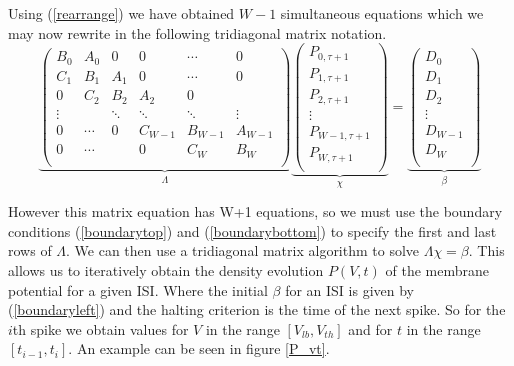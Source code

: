 \documentclass[10pt]{article}
\begin{document}
Using (\ref{rearrange}) we have obtained $W-1$ simultaneous equations which
we may now rewrite in the following tridiagonal matrix notation.
\begin{equation}
\underbrace{
\begin{pmatrix}
    B_0    & A_0   & 0      & 0      & \cdots  & 0       \\
    C_1    & B_1   & A_1    & 0      & \cdots  & 0       \\
    0      & C_2   & B_2    & A_2    & 0      &         \\
    \vdots &       & \ddots & \ddots & \ddots & \vdots  \\
    0      & \cdots & 0      & C_{W-1}& B_{W-1}& A_{W-1} \\
    0      & \cdots &        & 0      & C_W    & B_W     \\
\end{pmatrix}}_{\Lambda}
\underbrace{
\begin{pmatrix}
    P_{0,\tau+1}   \\
    P_{1,\tau+1}   \\
    P_{2,\tau+1}   \\
    \vdots         \\
    P_{W-1,\tau+1} \\
    P_{W,\tau+1}   \\
\end{pmatrix}}_{\chi}
=
\underbrace{
\begin{pmatrix}
    D_0     \\
    D_1     \\
    D_2     \\
    \vdots  \\
    D_{W-1} \\
    D_W     \\
\end{pmatrix}}_{\beta}
\end{equation}

However this matrix equation has W+1 equations, so we must use the
boundary conditions (\ref{boundarytop}) and
(\ref{boundarybottom}) to specify the first and last rows of $\Lambda$.
We can then use a tridiagonal matrix algorithm to solve $\Lambda \chi
= \beta$. This allows us to iteratively obtain the density evolution $P(V,t)$ of the
membrane potential for a given ISI. Where the initial $\beta$ for an ISI is given by
(\ref{boundaryleft}) and the halting criterion is the time of the next
spike. So for the $i$th spike we obtain values for $V$ in the range
$[V_{lb}, V_{th}]$ and for $t$ in the range $[t_{i-1},t_{i}]$. An
example can be seen in figure \ref{P_vt}.
\end{document}
